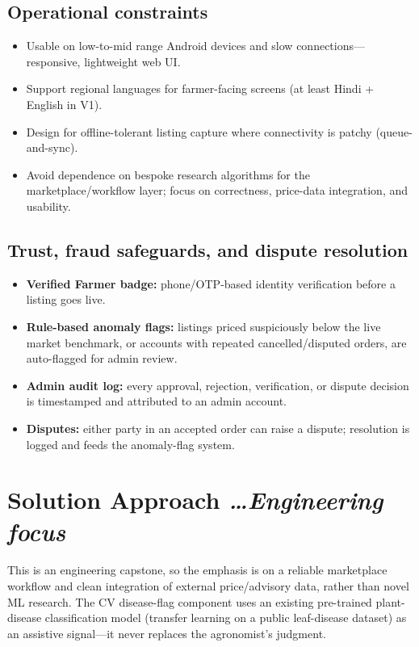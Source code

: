 \documentclass[11pt,a4paper]{article}
\newcommand{\BvrHint}[1]{%
  {\normalfont\normalsize\itshape\hfill #1}}
\begin{document}
\subsection{Operational constraints}
\begin{itemize}[leftmargin=0.7cm]
    \item Usable on low-to-mid range Android devices and slow connections---responsive, lightweight web UI.
    \item Support regional languages for farmer-facing screens (at least Hindi + English in V1).
    \item Design for offline-tolerant listing capture where connectivity is patchy (queue-and-sync).
    \item Avoid dependence on bespoke research algorithms for the marketplace/workflow layer; focus on correctness, price-data integration, and usability.
\end{itemize}

\subsection{Trust, fraud safeguards, and dispute resolution}
\begin{itemize}[leftmargin=0.7cm]
    \item \textbf{Verified Farmer badge:} phone/OTP-based identity verification before a listing goes live.
    \item \textbf{Rule-based anomaly flags:} listings priced suspiciously below the live market benchmark, or accounts with repeated cancelled/disputed orders, are auto-flagged for admin review.
    \item \textbf{Admin audit log:} every approval, rejection, verification, or dispute decision is timestamped and attributed to an admin account.
    \item \textbf{Disputes:} either party in an accepted order can raise a dispute; resolution is logged and feeds the anomaly-flag system.
\end{itemize}

\section{Solution Approach %
  \BvrHint{\ldots Engineering focus}}
This is an engineering capstone, so the emphasis is on a reliable marketplace workflow and clean integration of external price/advisory data, rather than novel ML research. The CV disease-flag component uses an existing pre-trained plant-disease classification model (transfer learning on a public leaf-disease dataset) as an assistive signal---it never replaces the agronomist's judgment.
\end{document}
